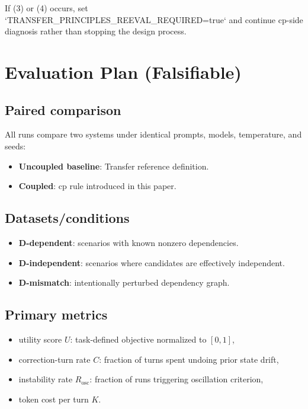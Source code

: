 \documentclass[11pt,a4paper]{article}
\begin{document}
If (3) or (4) occurs, set `TRANSFER\_PRINCIPLES\_REEVAL\_REQUIRED=true` and continue cp-side diagnosis rather than stopping the design process.

\section{Evaluation Plan (Falsifiable)}
\subsection{Paired comparison}
All runs compare two systems under identical prompts, models, temperature, and seeds:
\begin{itemize}
  \item \textbf{Uncoupled baseline}: Transfer reference definition.
  \item \textbf{Coupled}: cp rule introduced in this paper.
\end{itemize}

\subsection{Datasets/conditions}
\begin{itemize}
  \item \textbf{D-dependent}: scenarios with known nonzero dependencies.
  \item \textbf{D-independent}: scenarios where candidates are effectively independent.
  \item \textbf{D-mismatch}: intentionally perturbed dependency graph.
\end{itemize}

\subsection{Primary metrics}
\begin{itemize}
  \item utility score \(U\): task-defined objective normalized to \([0,1]\),
  \item correction-turn rate \(C\): fraction of turns spent undoing prior state drift,
  \item instability rate \(R_{\text{osc}}\): fraction of runs triggering oscillation criterion,
  \item token cost per turn \(K\).
\end{itemize}
\end{document}
